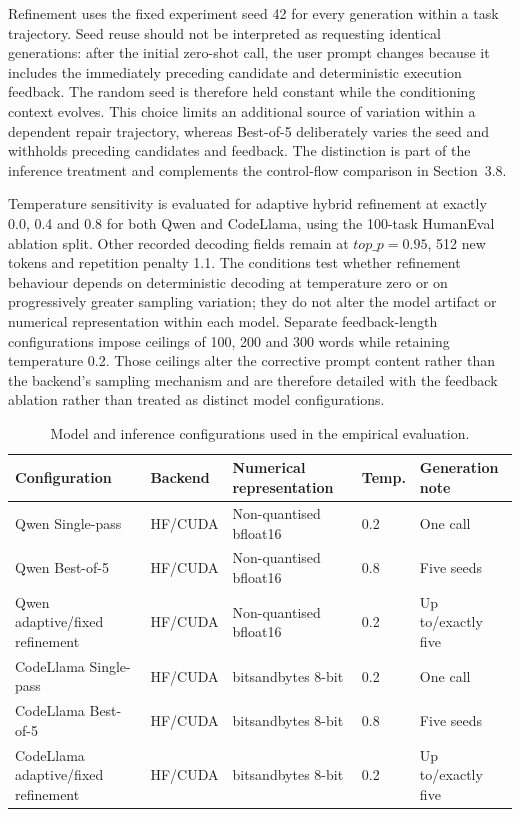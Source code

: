 Refinement uses the fixed experiment seed 42 for every generation within a task trajectory. Seed reuse should not be interpreted as requesting identical generations: after the initial zero-shot call, the user prompt changes because it includes the immediately preceding candidate and deterministic execution feedback. The random seed is therefore held constant while the conditioning context evolves. This choice limits an additional source of variation within a dependent repair trajectory, whereas Best-of-5 deliberately varies the seed and withholds preceding candidates and feedback. The distinction is part of the inference treatment and complements the control-flow comparison in Section~3.8.

Temperature sensitivity is evaluated for adaptive hybrid refinement at exactly 0.0, 0.4 and 0.8 for both Qwen and CodeLlama, using the 100-task HumanEval ablation split. Other recorded decoding fields remain at \(\mathit{top\_p}=0.95\), 512 new tokens and repetition penalty 1.1. The conditions test whether refinement behaviour depends on deterministic decoding at temperature zero or on progressively greater sampling variation; they do not alter the model artifact or numerical representation within each model. Separate feedback-length configurations impose ceilings of 100, 200 and 300 words while retaining temperature 0.2. Those ceilings alter the corrective prompt content rather than the backend's sampling mechanism and are therefore detailed with the feedback ablation rather than treated as distinct model configurations.

\begin{table}[htbp]
    \centering
    \caption{Model and inference configurations used in the empirical evaluation.}
    \label{tab:model-inference-config}
    \small
    \renewcommand{\arraystretch}{1.15}
    \begin{tabular}{p{} p{} p{} p{} p{}}
        \hline
        \raggedright Configuration & \raggedright Backend & \raggedright Numerical representation & \raggedright Temp. & \raggedright Generation note \tabularnewline
        \hline
        \raggedright Qwen Single-pass & \raggedright HF/CUDA & \raggedright Non-quantised bfloat16 & \raggedright 0.2 & \raggedright One call \tabularnewline
        \raggedright Qwen Best-of-5 & \raggedright HF/CUDA & \raggedright Non-quantised bfloat16 & \raggedright 0.8 & \raggedright Five seeds \tabularnewline
        \raggedright Qwen adaptive/fixed refinement & \raggedright HF/CUDA & \raggedright Non-quantised bfloat16 & \raggedright 0.2 & \raggedright Up to/exactly five \tabularnewline
        \raggedright CodeLlama Single-pass & \raggedright HF/CUDA & \raggedright bitsandbytes 8-bit & \raggedright 0.2 & \raggedright One call \tabularnewline
        \raggedright CodeLlama Best-of-5 & \raggedright HF/CUDA & \raggedright bitsandbytes 8-bit & \raggedright 0.8 & \raggedright Five seeds \tabularnewline
        \raggedright CodeLlama adaptive/fixed refinement & \raggedright HF/CUDA & \raggedright bitsandbytes 8-bit & \raggedright 0.2 & \raggedright Up to/exactly five \tabularnewline
        \hline
    \end{tabular}
\end{table}

